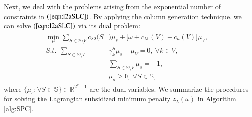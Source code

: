 \documentclass[authoryear,review,12pt]{elsarticle}
\newcommand{\R}{\mathbb{R}}
\begin{document}
Next, we deal with the problems arising from the exponential number of constraints in $(\ref{eqn:l2aSLC})$.
By applying the column generation technique, we can solve $(\ref{eqn:l2aSLC})$ via its dual problem:
\begin{eqnarray}\label{eqn:master}
\begin{aligned}
\min_{\mu} \sum_{S \in \mathbb{S} \setminus V} c_{\lambda2}(S&)\mu_s + \big[ \omega  + c_{\lambda1}(V) -c_u(V) \big]\mu_V,\\
S.t.~~\sum_{S \in \mathbb{S} \setminus V}& \gamma_k^S \mu_s - \mu_V = 0,~\forall k \in V,\\
-&\sum_{S \in \mathbb{S} \setminus V} \mu_s = -1,\\
&\mu_s \geq 0, ~\forall S \in \mathbb{S},
\end{aligned}
\end{eqnarray}
where $\{ \mu_s:\forall S \in \mathbb{S} \} \in \R^{2^v-1}$ are the dual variables.
We summarize the procedures for solving the Lagrangian subsidized minimum penalty $z_{\lambda}(\omega)$ in Algorithm \ref{alg:SPC}.
\end{document}
